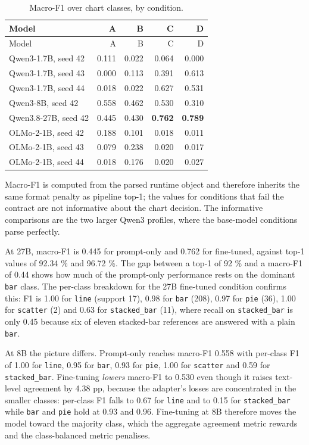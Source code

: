 \begingroup\footnotesize\setlength{\tabcolsep}{3pt}\sloppy
\begin{longtable}[]{@{}lrrrr@{}}
\caption{Macro-F1 over chart classes, by condition.}\tabularnewline
\toprule\noalign{}
Model & A & B & C & D \\
\midrule\noalign{}
\endfirsthead
\toprule\noalign{}
Model & A & B & C & D \\
\midrule\noalign{}
\endhead
\bottomrule\noalign{}
\endlastfoot
Qwen3-1.7B, seed 42 & 0.111 & 0.022 & 0.064 & 0.000 \\
Qwen3-1.7B, seed 43 & 0.000 & 0.113 & 0.391 & 0.613 \\
Qwen3-1.7B, seed 44 & 0.018 & 0.022 & 0.627 & 0.531 \\
Qwen3-8B, seed 42 & 0.558 & 0.462 & 0.530 & 0.310 \\
Qwen3.8-27B, seed 42 & 0.445 & 0.430 & \textbf{0.762} & \textbf{0.789} \\
OLMo-2-1B, seed 42 & 0.188 & 0.101 & 0.018 & 0.011 \\
OLMo-2-1B, seed 43 & 0.079 & 0.238 & 0.020 & 0.017 \\
OLMo-2-1B, seed 44 & 0.018 & 0.176 & 0.020 & 0.027 \\
\end{longtable}
\endgroup

Macro-F1 is computed from the parsed runtime object and therefore inherits the same format penalty as pipeline top-1; the values for conditions that fail the contract are not informative about the chart decision. The informative comparisons are the two larger Qwen3 profiles, where the base-model conditions parse perfectly.

At 27B, macro-F1 is 0.445 for prompt-only and 0.762 for fine-tuned, against top-1 values of 92.34 \% and 96.72 \%. The gap between a top-1 of 92 \% and a macro-F1 of 0.44 shows how much of the prompt-only performance rests on the dominant \texttt{bar} class. The per-class breakdown for the 27B fine-tuned condition confirms this: F1 is 1.00 for \texttt{line} (support 17), 0.98 for \texttt{bar} (208), 0.97 for \texttt{pie} (36), 1.00 for \texttt{scatter} (2) and 0.63 for \texttt{stacked\_bar} (11), where recall on \texttt{stacked\_bar} is only 0.45 because six of eleven stacked-bar references are answered with a plain \texttt{bar}.

At 8B the picture differs. Prompt-only reaches macro-F1 0.558 with per-class F1 of 1.00 for \texttt{line}, 0.95 for \texttt{bar}, 0.93 for \texttt{pie}, 1.00 for \texttt{scatter} and 0.59 for \texttt{stacked\_bar}. Fine-tuning \emph{lowers} macro-F1 to 0.530 even though it raises text-level agreement by 4.38 pp, because the adapter's losses are concentrated in the smaller classes: per-class F1 falls to 0.67 for \texttt{line} and to 0.15 for \texttt{stacked\_bar} while \texttt{bar} and \texttt{pie} hold at 0.93 and 0.96. Fine-tuning at 8B therefore moves the model toward the majority class, which the aggregate agreement metric rewards and the class-balanced metric penalises.

